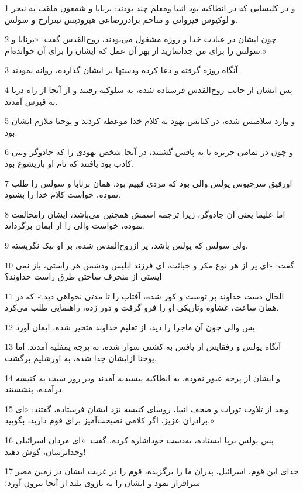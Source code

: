 \par 1 و در کلیسایی که در انطاکیه بود انبیا ومعلم چند بودند: برنابا و شمعون ملقب به نیجر و لوکیوس قیروانی و مناحم برادررضاعی هیرودیس تیترارخ و سولس.
\par 2 چون ایشان در عبادت خدا و روزه مشغول می‌بودند، روح‌القدس گفت: «برنابا و سولس را برای من جداسازید از بهر آن عمل که ایشان را برای آن خوانده‌ام.»
\par 3 آنگاه روزه گرفته و دعا کرده ودستها بر ایشان گذارده، روانه نمودند.
\par 4 پس ایشان از جانب روح‌القدس فرستاده شده، به سلوکیه رفتند و از آنجا از راه دریا به قپرس آمدند.
\par 5 و وارد سلامیس شده، در کنایس یهود به کلام خدا موعظه کردند و یوحنا ملازم ایشان بود.
\par 6 و چون در تمامی جزیره تا به پافس گشتند، در آنجا شخص یهودی را که جادوگر ونبی کاذب بود یافتند که نام او باریشوع بود.
\par 7 اورفیق سرجیوس پولس والی بود که مردی فهیم بود. همان برنابا و سولس را طلب نموده، خواست کلام خدا را بشنود.
\par 8 اما علیما یعنی آن جادوگر، زیرا ترجمه اسمش همچنین می‌باشد، ایشان رامخالفت نموده، خواست والی را از ایمان برگرداند.
\par 9 ولی سولس که پولس باشد، پر ازروح‌القدس شده، بر او نیک نگریسته،
\par 10 گفت: «ای پر از هر نوع مکر و خباثت، ای فرزند ابلیس ودشمن هر راستی، باز نمی ایستی از منحرف ساختن طرق راست خداوند؟
\par 11 الحال دست خداوند بر توست و کور شده، آفتاب را تا مدتی نخواهی دید.» که در همان ساعت، غشاوه وتاریکی او را فرو گرفت و دور زده، راهنمایی طلب می‌کرد.
\par 12 پس والی چون آن ماجرا را دید، از تعلیم خداوند متحیر شده، ایمان آورد.
\par 13 آنگاه پولس و رفقایش از پافس به کشتی سوار شده، به پرجه پمفلیه آمدند. اما یوحنا ازایشان جدا شده، به اورشلیم برگشت.
\par 14 و ایشان از پرجه عبور نموده، به انطاکیه پیسیدیه آمدند ودر روز سبت به کنیسه درآمده، بنشستند.
\par 15 وبعد از تلاوت تورات و صحف انبیا، روسای کنیسه نزد ایشان فرستاده، گفتند: «ای برادران عزیز، اگر کلامی نصیحت‌آمیز برای قوم دارید، بگویید.»
\par 16 پس پولس برپا ایستاده، به‌دست خوداشاره کرده، گفت: «ای مردان اسرائیلی وخداترسان، گوش دهید!
\par 17 خدای این قوم، اسرائیل، پدران ما را برگزیده، قوم را در غربت ایشان در زمین مصر سرافراز نمود و ایشان را به بازوی بلند از آنجا بیرون آورد؛
